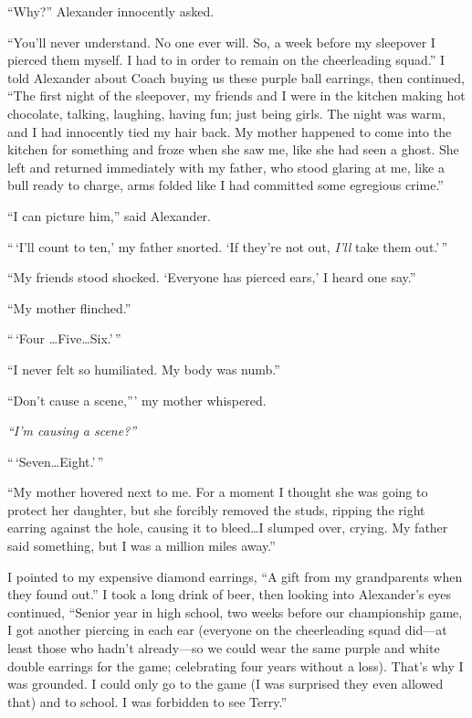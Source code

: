 ``Why?'' Alexander innocently asked.

``You'll never understand. No one ever will. So, a week before my
sleepover I pierced them myself. I had to in order to remain on the
cheerleading squad.'' I told Alexander about Coach buying us these
purple ball earrings, then continued, ``The first night of the
sleepover, my friends and I were in the kitchen making hot chocolate,
talking, laughing, having fun; just being girls. The night was warm, and
I had innocently tied my hair back. My mother happened to come into the
kitchen for something and froze when she saw me, like she had seen a
ghost. She left and returned immediately with my father, who stood
glaring at me, like a bull ready to charge, arms folded like I had
committed some egregious crime.''

``I can picture him,'' said Alexander.

``\,`I'll count to ten,' my father snorted. `If they're not out,
\emph{I'll} take them out.'\,''

``My friends stood shocked. `Everyone has pierced ears,' I heard one
say.''

``My mother flinched.''

``\,`Four \ldots Five\ldots Six.'\,''

``I never felt so humiliated. My body was numb.''

``Don't cause a scene,''' my mother whispered.

\emph{``I'm causing a scene?''}

``\,`Seven\ldots Eight.'\,''

``My mother hovered next to me. For a moment I thought she was going to
protect her daughter, but she forcibly removed the studs, ripping the
right earring against the hole, causing it to bleed\ldots I slumped
over, crying. My father said something, but I was a million miles
away.''

I pointed to my expensive diamond earrings, ``A gift from my
grandparents when they found out.'' I took a long drink of beer, then
looking into Alexander's eyes continued, ``Senior year in high school,
two weeks before our championship game, I got another piercing in each
ear (everyone on the cheerleading squad did---at least those who hadn't
already---so we could wear the same purple and white double earrings for
the game; celebrating four years without a loss). That's why I was
grounded. I could only go to the game (I was surprised they even allowed
that) and to school. I was forbidden to see Terry.''

